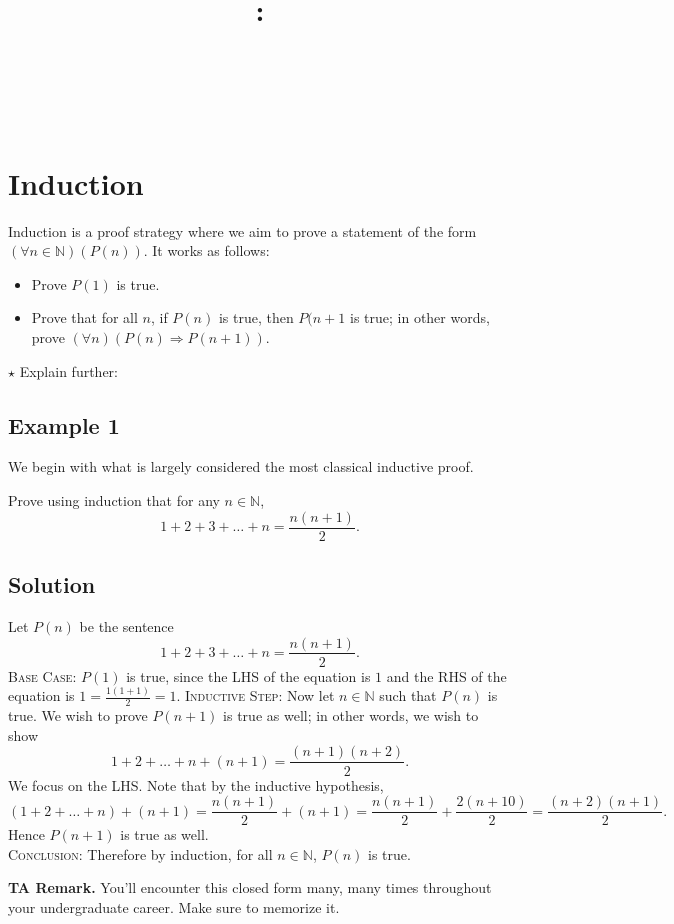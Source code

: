 \documentclass{article}
\title{
    \vspace{2in}
    \textbf{\lectClass:\\ \lectTitle}\\
    \vspace{0.1in}\large{\textit{\lectClassInstructor\ \lectSection}}
    \vspace{3in}
    \author{\textbf{\lectAuthorName}}
    \date{}
}
\begin{document}
\maketitle
\pagebreak

\section*{Induction}
    Induction is a proof strategy where we aim to prove a statement of the form $(\forall n \in \mathbb{N})(P(n))$. It works as follows:
    \begin{itemize}
        \item Prove $P(1)$ is true.
        \item Prove that for all $n$, if $P(n)$ is true, then $P(n + 1$ is true; in other words, prove $(\forall n)(P(n) \Rightarrow P(n + 1))$.
    \end{itemize}
    
    $\star$ Explain further:

\subsection*{Example 1}
    We begin with what is largely considered the most classical inductive proof.
    
    Prove using induction that for any $n \in \mathbb{N}$, $$1 + 2 + 3 + \dots + n = \frac{n(n + 1)}{2}.$$

\subsection*{Solution}
    Let $P(n)$ be the sentence $$1 + 2 + 3 + \dots + n = \frac{n(n + 1)}{2}.$$
    \textsc{Base Case}: $P(1)$ is true, since the LHS of the equation is $1$ and the RHS of the equation is $1 = \frac{1(1 + 1)}{2} = 1.$
    \textsc{Inductive Step}: Now let $n \in \mathbb{N}$ such that $P(n)$ is true. We wish to prove $P(n + 1)$ is true as well; in other words, we wish to show $$1 + 2 + \dots + n + (n + 1) = \frac{(n + 1)(n + 2)}{2}.$$ We focus on the LHS. Note that by the inductive hypothesis, $$(1 + 2 + \dots + n) + (n + 1) = \frac{n(n + 1)}{2} + (n + 1) = \frac{n(n + 1)}{2} + \frac{2(n + 10)}{2} = \frac{(n + 2)(n + 1)}{2}.$$
    Hence $P(n + 1)$ is true as well. \\
    \textsc{Conclusion}: Therefore by induction, for all $n \in \mathbb{N}$, $P(n)$ is true.
    
    \vspace{1.5mm}
    \textbf{TA Remark.} You'll encounter this closed form many, many times throughout your undergraduate career. Make sure to memorize it.
\end{document}
